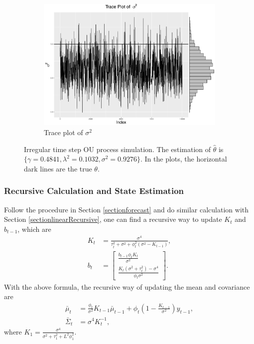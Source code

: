 \begin{figure}[h]
\begin{subfigure}[b]{0.3\textwidth}
    \includegraphics[width=\textwidth]{Chapters/05MCMCOU/plots/simudataOUtracesig2.pdf}
     \caption{Trace plot of $\sigma^2$}
\end{subfigure}
\caption{Irregular time step OU process simulation. The estimation of $\hat{\theta}$ is $\{\gamma=0.4841, \lambda^2=0.1032, \sigma^2=0.9276\}$. In the plots, the horizontal dark lines are the true $\theta$. }
\label{simuOUmarginplots}
\end{figure}



\subsubsection*{Recursive Calculation and State Estimation}

Follow the procedure in Section \ref{sectionforecast} and do similar calculation with Section \ref{sectionlinearRecursive}, one can find a recursive way to update $K_{t}$ and $b_{t-1}$, which are 
\begin{align} \label{linearOUK}
K_{t}  &=\frac{\sigma^4}{\tau_t^2+\sigma^2+\phi_t^2(\sigma^2-K_{t-1})},\\
b_{t} &= \begin{bmatrix}
\frac{b_{t-1}\phi_t K_{t}}{\sigma^2} \\ \frac{K_{t}(\sigma^2+\tau_t^2)-\sigma^4 }{\phi_t\sigma^2}
\end{bmatrix}. 
\end{align}
With the above formula, the recursive way of updating the mean and covariance are 
\begin{align} \label{linearOUmu}
\bar{\mu}_{t}       & = \frac{\phi_t}{\sigma^2}K_{t-1}\bar{\mu}_{t-1} + \phi_t \left(1 - \frac{K_{t-1}}{\sigma^2}\right)y_{t-1}, \\
\bar{\Sigma}_{t}  &= \sigma^4K_{t}^{-1}, \label{linearOUsigma}
\end{align}
where $K_1=\frac{\sigma^4}{\sigma^2+\tau_1^2+L^2\phi_1^2}$. 

